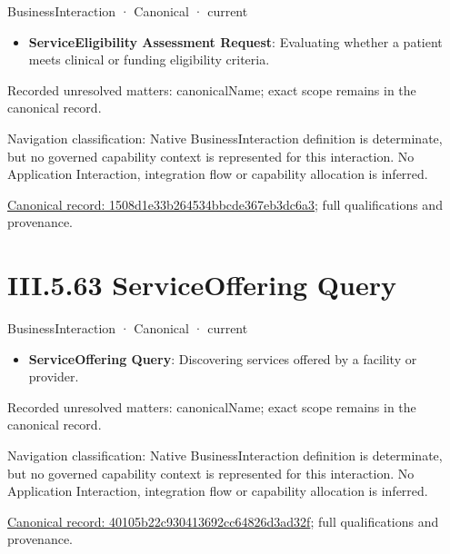 \label{element:1508d1e33b264534bbcde367eb3dc6a3}
{\small BusinessInteraction · Canonical · current}\par

\begin{itemize}


\item \textbf{ServiceEligibility Assessment Request}: Evaluating whether a patient meets clinical or funding eligibility criteria.

\end{itemize}

{\small Recorded unresolved matters: canonicalName; exact scope remains in the canonical record.}\par
{\small Navigation classification: Native BusinessInteraction definition is determinate, but no governed capability context is represented for this interaction. No Application Interaction, integration flow or capability allocation is inferred.}\par
{\footnotesize \href{../../../../../../../../continuum/business/business-interaction/1508d1e33b264534bbcde367eb3dc6a3.md}{Canonical record: 1508d1e33b264534bbcde367eb3dc6a3}; full qualifications and provenance.}\par
\section*{III.5.63 ServiceOffering Query}
\label{navigation:III.5.63}

\label{element:40105b22c930413692cc64826d3ad32f}
{\small BusinessInteraction · Canonical · current}\par

\begin{itemize}


\item \textbf{ServiceOffering Query}: Discovering services offered by a facility or provider.

\end{itemize}

{\small Recorded unresolved matters: canonicalName; exact scope remains in the canonical record.}\par
{\small Navigation classification: Native BusinessInteraction definition is determinate, but no governed capability context is represented for this interaction. No Application Interaction, integration flow or capability allocation is inferred.}\par
{\footnotesize \href{../../../../../../../../continuum/business/business-interaction/40105b22c930413692cc64826d3ad32f.md}{Canonical record: 40105b22c930413692cc64826d3ad32f}; full qualifications and provenance.}\par

